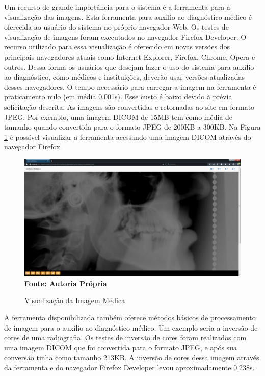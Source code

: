 Um recurso de grande importância para o sistema é a ferramenta para a visualização das imagens. Esta ferramenta para auxílio ao diagnóstico médico é oferecida ao usuário do sistema no próprio navegador Web. Os testes de visualização de imagens foram executados no navegador Firefox Developer. O recurso utilizado para essa visualização é 
oferecido em novas versões dos principais navegadores atuais como Internet Explorer, Firefox, Chrome, Opera e outros. Dessa forma os usuários que desejam fazer o uso do sistema 
para auxílio ao diagnóstico, como médicos e instituições, deverão usar versões atualizadas desses navegadores. O tempo necessário para carregar a imagem na ferramenta é
praticamento nulo (em média 0,001s). Esse custo é baixo devido à prévia solicitação descrita. As imagens são convertidas e retornadas ao site em formato JPEG. Por exemplo, uma  imagem DICOM de 15MB tem como média de tamanho quando convertida para o formato JPEG de 200KB a 300KB. Na Figura \ref{fig:figura4} é possível visualizar a ferramenta acessando uma imagem DICOM através do navegador Firefox.

\begin{figure}[ht]
	\centering	
	\caption[\hspace{0.1cm}Imagens Clínicas.]{Visualização da Imagem Médica}
	\vspace{-0.4cm}
	\includegraphics[width=1.0\textwidth]{figuras/visualizacaoImagemMedicaGrandeResolucao.png}
	\vspace{-0.2cm}
	\\\textbf{\footnotesize Fonte: Autoria Própria }
	\label{fig:figura4}
\end{figure}

A ferramenta disponibilizada também oferece métodos básicos de processamento de imagem para o auxílio ao diagnóstico médico. Um exemplo seria a inversão de cores de uma radiografia. Os testes de inversão de cores foram realizados com uma imagem DICOM que foi convertida para o formato JPEG, e após sua conversão tinha como  tamanho 213KB. A inversão de cores dessa imagem através da ferramenta e do navegador Firefox Developer levou aproximadamente 0,238s. 

